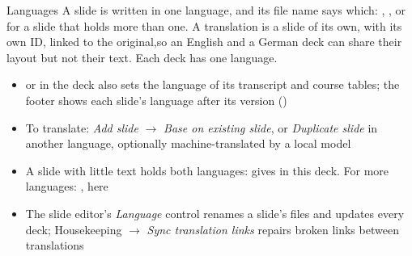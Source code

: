 
\begin{standardframe}{Languages}
	\small
	A slide is written in one language, and its file name says which: , , or  for a slide that holds more than one. A translation is a slide of its own, with its own ID, linked to the original,so an English and a German deck can share their layout but not their text. Each deck has one language.
	\par\medskip
	\begin{itemize}
		\item {}\SMCode{[en]} or \SMCode{[de]} in the deck also sets the language of its transcript and course tables; the footer shows each slide's language after its version ()
		\item To translate: \emph{Add slide} $\rightarrow$ \emph{Base on existing slide}, or \emph{Duplicate slide} in another language, optionally machine-translated by a local model
		\item A slide with little text holds both languages:  gives \emph{} in this deck. For more languages: , here \emph{}
		\item The slide editor's \emph{Language} control renames a slide's files and updates every deck; Housekeeping $\rightarrow$ \emph{Sync translation links} repairs broken links between translations
	\end{itemize}
\end{standardframe}
